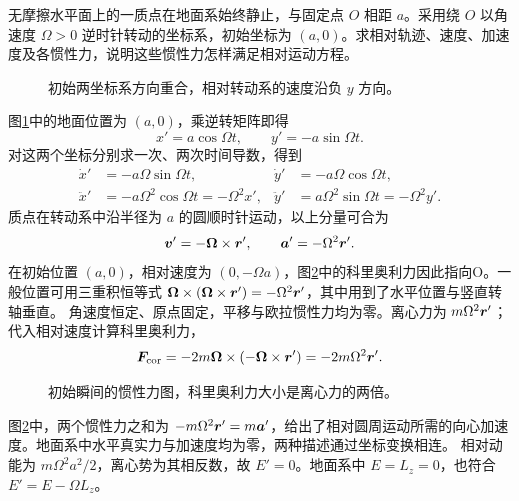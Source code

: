 \begin{exercise}[地面静止点的转动系运动]\label{rot:problem-exercise-5}\label{rot:ex:d6-h5}
无摩擦水平面上的一质点在地面系始终静止，与固定点 $O$ 相距 $a$。采用绕 $O$ 以角速度 $\Omega>0$ 逆时针转动的坐标系，初始坐标为 $(a,0)$。求相对轨迹、速度、加速度及各惯性力，说明这些惯性力怎样满足相对运动方程。
\end{exercise}
\begin{figure}[H]\centering
{}
\caption{初始两坐标系方向重合，相对转动系的速度沿负 $y$ 方向。}\label{rot:fig:d6-h5-q}
\end{figure}
\begin{solution}
图\ref{rot:fig:d6-h5-q}中的地面位置为 $(a,0)$，乘逆转矩阵即得
\[
x'=a\cos\Omega t,\qquad y'=-a\sin\Omega t.
\]
对这两个坐标分别求一次、两次时间导数，得到
\[
\begin{aligned}
\dot x'&=-a\Omega\sin\Omega t,&\dot y'&=-a\Omega\cos\Omega t,\\
\ddot x'&=-a\Omega^2\cos\Omega t=-\Omega^2x',&
\ddot y'&=a\Omega^2\sin\Omega t=-\Omega^2y'.
\end{aligned}
\]
质点在转动系中沿半径为 $a$ 的圆顺时针运动，以上分量可合为
\[
\bm{v}'=-\bm{\Omega}\times\bm{r}',\qquad
\bm{a}'=-\Omega^2\bm{r}'.
\]
在初始位置 $(a,0)$，相对速度为 $(0,-\Omega a)$，图\ref{rot:fig:d6-h5-s}中的科里奥利力因此指向O。一般位置可用三重积恒等式 $\bm{\Omega}\times(\bm{\Omega}\times\bm{r}')=-\Omega^2\bm{r}'$，其中用到了水平位置与竖直转轴垂直。
角速度恒定、原点固定，平移与欧拉惯性力均为零。离心力为 $m\Omega^2\bm{r}'$；代入相对速度计算科里奥利力，
\[
\bm{F}_{\rm cor}=-2m\bm{\Omega}\times(-\bm{\Omega}\times\bm{r}')
=-2m\Omega^2\bm{r}'.
\]
\begin{figure}[H]\centering
{}
\caption{初始瞬间的惯性力图，科里奥利力大小是离心力的两倍。}\label{rot:fig:d6-h5-s}
\end{figure}
图\ref{rot:fig:d6-h5-s}中，两个惯性力之和为 $-m\Omega^2\bm{r}'=m\bm{a}'$，给出了相对圆周运动所需的向心加速度。地面系中水平真实力与加速度均为零，两种描述通过坐标变换相连。
相对动能为 $m\Omega^2a^2/2$，离心势为其相反数，故 $E'=0$。地面系中 $E=L_z=0$，也符合 $E'=E-\Omega L_z$。
\end{solution}


